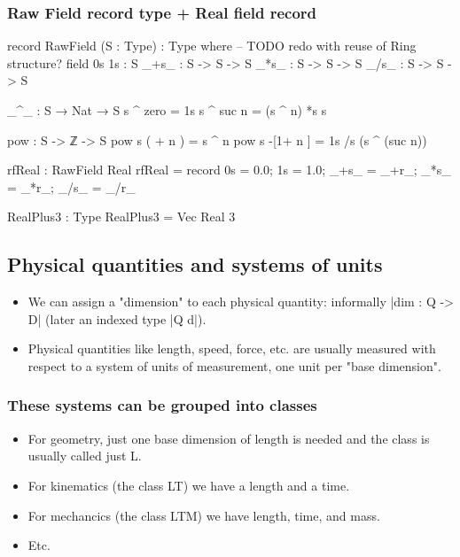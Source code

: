 \documentclass{article}
\begin{document}
\subsubsection{Raw Field record type + Real field record}
\label{sec:org04f9479}
\begin{code}
record RawField (S : Type) : Type where
  -- TODO redo with reuse of Ring structure?
  field
    0s 1s : S
    _+s_ : S -> S -> S
    _*s_ : S -> S -> S
    _/s_ : S -> S -> S

  _^_ : S → Nat → S
  s ^ zero   = 1s
  s ^ suc n  = (s ^ n) *s s

  pow : S -> ℤ -> S
  pow s  ( + n )  =        s ^ n
  pow s -[1+ n ]  = 1s /s (s ^ (suc n))

rfReal : RawField Real
rfReal = record {0s = 0.0; 1s = 1.0; _+s_ = _+r_; _*s_ = _*r_; _/s_ = _/r_}

RealPlus3 : Type
RealPlus3 = Vec Real 3
\end{code}
\subsection{Physical quantities and systems of units}
\label{sec:orgb97e3b3}
\begin{itemize}
\item We can assign a "dimension" to each physical quantity:
informally |dim : Q -> D| (later an indexed type |Q d|).
\item Physical quantities like length, speed, force, etc. are usually
measured with respect to a system of units of measurement, one unit
per "base dimension".
\end{itemize}
\subsubsection{These systems can be grouped into classes}
\label{sec:org2870a1b}
\begin{itemize}
\item For geometry, just one base dimension of length is needed and the
class is usually called just L.
\item For kinematics (the class LT) we have a length and a time.
\item For mechancics (the class LTM) we have length, time, and mass.
\item Etc.
\end{itemize}
\end{document}

